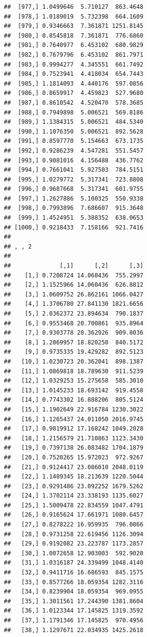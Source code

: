 \documentclass[article]{jss}\usepackage[]{graphicx}\usepackage[]{xcolor}
\makeatletter
\newenvironment{kframe}{%
 \def\at@end@of@kframe{}%
 \ifinner\ifhmode%
  \def\at@end@of@kframe{\end{minipage}}%
  \begin{minipage}{\columnwidth}%
 \fi\fi%
 \def\FrameCommand##1{\hskip\@totalleftmargin \hskip-\fboxsep
 \colorbox{shadecolor}{##1}\hskip-\fboxsep
     \hskip-\linewidth \hskip-\@totalleftmargin \hskip\columnwidth}%
 \MakeFramed {\advance\hsize-\width
   \@totalleftmargin\z@ \linewidth\hsize
   \@setminipage}}%
 {\par\unskip\endMakeFramed%
 \at@end@of@kframe}
\newenvironment{knitrout}{}{} %
\makeatother
\begin{document}
\begin{knitrout}
\begin{kframe}
\begin{verbatim}
##  [977,] 1.0499646  5.710127  863.4648
##  [978,] 1.0189019  5.732398  664.1609
##  [979,] 0.9346663  7.361871 1251.8145
##  [980,] 0.8545818  7.361871  776.6860
##  [981,] 0.7640977  6.453102  680.9829
##  [982,] 0.7679796  6.453102  861.7971
##  [983,] 0.9994277  4.345551  661.7492
##  [984,] 0.7523941  4.418034  654.7443
##  [985,] 1.1814093  4.440176  597.0856
##  [986,] 0.8659917  4.459823  527.9680
##  [987,] 0.8610542  4.520470  578.3685
##  [988,] 0.7949898  5.006521  569.8186
##  [989,] 1.1384315  5.006521  484.5340
##  [990,] 1.1076350  5.006521  892.5628
##  [991,] 0.8597770  5.154663  673.1735
##  [992,] 0.9286239  4.547281  551.5457
##  [993,] 0.9081016  4.156488  436.7762
##  [994,] 0.7661041  5.927503  784.5151
##  [995,] 1.0279772  5.317341  723.8808
##  [996,] 0.9687668  5.317341  601.9755
##  [997,] 1.2627886  5.100325  550.9338
##  [998,] 0.7993896  7.686607  915.3648
##  [999,] 1.4524951  5.388352  638.0653
## [1000,] 0.9218433  7.158166  921.7416
## 
## , , 2
## 
##              [,1]      [,2]      [,3]
##    [1,] 0.7208724 14.060436  755.2997
##    [2,] 1.1525966 14.060436  626.8812
##    [3,] 1.0609752 26.862161 1066.0427
##    [4,] 1.3706780 27.841130 1821.6656
##    [5,] 2.0362372 23.894634  790.1837
##    [6,] 0.9553468 20.700861  935.8964
##    [7,] 0.9303778 20.362926  909.8036
##    [8,] 1.2069957 18.820250  840.5172
##    [9,] 0.9735335 19.429282  892.5123
##   [10,] 1.0230723 20.362041  898.1387
##   [11,] 1.0869818 18.789630  911.5239
##   [12,] 1.0329253 15.275658  585.3010
##   [13,] 1.0145233 18.693142  919.4558
##   [14,] 0.7743302 16.888206  805.5124
##   [15,] 1.1902649 22.916784 1230.3022
##   [16,] 1.1265437 24.011050 2016.9745
##   [17,] 0.9819912 17.168242 1049.2028
##   [18,] 1.2156579 21.710863 1123.3430
##   [19,] 0.7397138 26.083482 1704.1879
##   [20,] 0.7520265 15.972023  972.9267
##   [21,] 0.9124417 23.086010 2048.0119
##   [22,] 1.1489345 18.213639 1220.5044
##   [23,] 0.9291486 23.092252 1679.5262
##   [24,] 1.3702114 23.338193 1135.6027
##   [25,] 1.5009478 22.834559 1047.4791
##   [26,] 0.9165624 17.661971 1080.6457
##   [27,] 0.8278222 16.959935  796.0866
##   [28,] 0.9731258 22.619456 1126.3094
##   [29,] 0.9192082 23.223787 1173.2857
##   [30,] 1.0072658 12.903003  592.9020
##   [31,] 1.0316187 24.339499 1048.4140
##   [32,] 0.9411716 16.686593  845.1575
##   [33,] 0.8577266 18.059354 1282.3116
##   [34,] 0.8239904 18.059354  969.0955
##   [35,] 1.3011561 17.244390 1381.8604
##   [36,] 1.0123344 17.145825 1319.3592
##   [37,] 1.1791346 17.145825  970.4956
##   [38,] 1.1297671 22.034935 1425.2618

\end{verbatim}
\end{kframe}
\end{knitrout}
\end{document}
